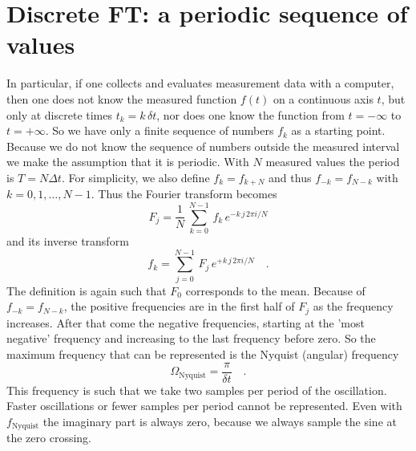 

\section{Discrete FT: a periodic sequence of values}


In particular, if one collects and evaluates measurement data with a computer, then one does not know the measured function $f(t)$ on a continuous axis $t$, but only at discrete times $t_k = k \, \delta t$, nor does one know the function from $t = - \infty$ to $t = + \infty$. So we have only a finite sequence of numbers $f_k$ as a starting point.
Because we do not know the sequence of numbers outside the measured interval we make the assumption that it is periodic. With $N$ measured values the period is $T = N \Delta t$. For simplicity, we also define $f_k = f_{k + N}$ and thus $f_{-k} = f_{N - k}$ with $k= 0, 1, \dots, N-1$. Thus the Fourier transform becomes
\begin{equation}
  F_j =  \frac{1}{N} \, \sum_{k=0}^{N-1} \, f_k \, e^{- k \, j \, 2 \pi i / N } 
 \end{equation}
and its inverse transform
 \begin{equation}
 f_k =   \sum_{j=0}^{N-1} \, F_j \, e^{+ k \,  j \, 2 \pi i / N } \quad .
 \end{equation}
The definition is again such that $F_0$ corresponds to the mean. Because of $f_{-k} = f_{N - k}$, the positive frequencies are in the first half of $F_j$ as the frequency increases. After that come the negative frequencies, starting at the 'most negative' frequency and increasing to the last frequency before zero. So the maximum frequency that can be represented is the Nyquist (angular) frequency
\begin{equation}
\Omega_\text{Nyquist} = \frac{\pi}{\delta t} \quad .
\end{equation}
%
This frequency is such that we take two samples per period of the
oscillation. Faster oscillations or fewer samples per period cannot be
represented. Even with $f_\text{Nyquist}$ the imaginary part is always zero, because we always sample the sine at the 
zero crossing.




